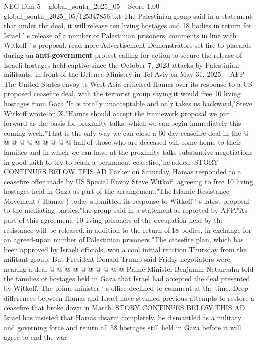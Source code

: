 \begin{textsample}{NEG Dim 5 – global\_south\_2025\_05 – Score 1.00 – global\_south\_2025\_05/125347856.txt}  \label{ex:f5_neg_336}
The Palestinian group said in a statement that under the deal, it will release ten living hostages and 18 bodies in return for Israel ' s release of a number of Palestinian prisoners, comments in line with Witkoff ' s proposal. read more Advertisement Demonstrators set fire to placards during an \textbf{anti-government} protest calling for action to secure the release of Israeli hostages held captive since the October 7, 2023 attacks by Palestinian militants, in front of the Defence Ministry in Tel Aviv on May 31, 2025. - AFP The United States envoy to West Asia criticised Hamas over its response to a US-proposed ceasefire deal, with the terrorist group saying it would free 10 living hostages from Gaza."It is totally unacceptable and only takes us backward,"Steve Witkoff wrote on X."Hamas should accept the framework proposal we put forward as the basis for proximity talks, which we can begin immediately this coming week."That is the only way we can close a 60-day ceasefire deal in the @ @ @ @ @ @ @ @ @ @ half of those who are deceased will come home to their families and in which we can have at the proximity talks substantive negotiations in good-faith to try to reach a permanent ceasefire,"he added.
STORY CONTINUES BELOW THIS AD Earlier on Saturday, Hamas responded to a ceasefire offer made by US Special Envoy Steve Witkoff, agreeing to free 10 living hostages held in Gaza as part of the arrangement."The Islamic Resistance Movement ( Hamas ) today submitted its response to Witkoff ' s latest proposal to the mediating parties,"the group said in a statement as reported by AFP."As part of this agreement, 10 living prisoners of the occupation held by the resistance will be released, in addition to the return of 18 bodies, in exchange for an agreed-upon number of Palestinian prisoners."The ceasefire plan, which has been approved by Israeli officials, won a cool initial reaction Thursday from the militant group.
But President Donald Trump said Friday negotiators were nearing a deal @ @ @ @ @ @ @ @ @ @ Prime Minister Benjamin Netanyahu told the families of hostages held in Gaza that Israel had accepted the deal presented by Witkoff.
The prime minister ' s office declined to comment at the time.
Deep differences between Hamas and Israel have stymied previous attempts to restore a ceasefire that broke down in March.
STORY CONTINUES BELOW THIS AD Israel has insisted that Hamas disarm completely, be dismantled as a military and governing force and return all 58 hostages still held in Gaza before it will agree to end the war.

\end{textsample}
